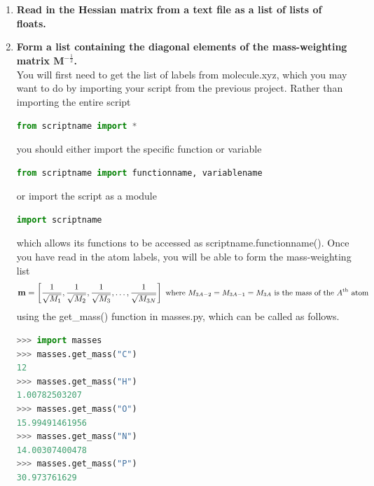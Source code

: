 \documentclass[11pt]{article}
\newcommand{\ttf}[1]{{\ttfamily #1}}
\newcommand{\bo}[1]{\ensuremath{\mathbf{#1}}}
\newcommand{\fr}[2]{\dfrac{#1}{#2}}
\newcommand{\eth}{\ensuremath{^\text{th}}}
\newcommand{\ld}{\ensuremath{\ldots}}
\begin{document}
\begin{enumerate}[label=\textbf{\arabic*}]
\item {\bf Read in the Hessian matrix from a text file as a list of lists of \ttf{float}s. }\\
\item {\bf Form a list containing the diagonal elements of the mass-weighting matrix $\bo{M}^{-\frac{1}{2}}$. }\\
You will first need to get the list of labels from \ttf{molecule.xyz}, which you may want to do by importing your script from the previous project.
Rather than importing the entire script
\begin{addmargin}{2cm}{}
\begin{lstlisting}[language=python]
from scriptname import *
\end{lstlisting}
\end{addmargin}
you should either import the specific function or variable
\begin{addmargin}{2cm}{}
\begin{lstlisting}[language=python]
from scriptname import functionname, variablename
\end{lstlisting}
\end{addmargin}
or import the script as a module
\begin{addmargin}{2cm}{}
\begin{lstlisting}[language=python]
import scriptname
\end{lstlisting}
\end{addmargin}
which allows its functions to be accessed as \ttf{scriptname.functionname()}.
Once you have read in the atom labels, you will be able to form the mass-weighting list
\begin{align*}
	\bo{m}
=
\left[
	\fr{1}{\sqrt{M_1}},
	\fr{1}{\sqrt{M_2}},
	\fr{1}{\sqrt{M_3}},\ld,
	\fr{1}{\sqrt{M_{3N}}} \right]
	\text{\small\ where $M_{3A-2} = M_{3A-1} = M_{3A}$ is the mass of the $A$\eth\ atom}
\end{align*}
using the \ttf{get\_mass()} function in \ttf{masses.py}, which can be called as follows.
\begin{addmargin}{2cm}{}
\begin{lstlisting}[language=python]
>>> import masses
>>> masses.get_mass("C")
12
>>> masses.get_mass("H")
1.00782503207
>>> masses.get_mass("O")
15.99491461956
>>> masses.get_mass("N")
14.00307400478
>>> masses.get_mass("P")
30.973761629
\end{lstlisting}

\end{addmargin}
\end{enumerate}
\end{document}
